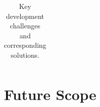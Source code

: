 \documentclass[12pt,a4paper]{article}
\begin{document}
\begin{table}[H]
\begin{tabular}{p{6.5cm} p{7cm}}


\bottomrule
\end{tabular}
\caption{Key development challenges and corresponding solutions.}
\label{tab:challenges}
\end{table}

\section{Future Scope}
\end{document}
